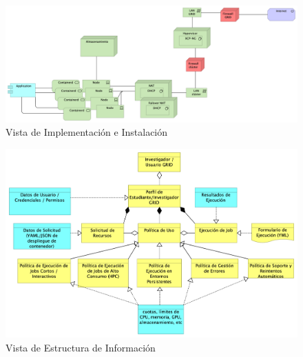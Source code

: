 \begin{figure}[H]
    \centering
    \includegraphics[width=\textwidth]{tablas-images/cp6/Implementation-and-Installation-View.png}
    \caption{Vista de Implementación e Instalación}
\end{figure}
\begin{figure}[H]
    \centering
    \includegraphics[width=\textwidth]{tablas-images/cp6/Information-Structure-View.png}
    \caption{Vista de Estructura de Información}
\end{figure}